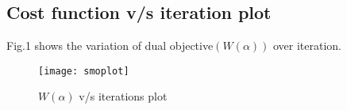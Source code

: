 \documentclass{article}
\begin{document}
\subsection{\textbf{Cost function v/s iteration plot}}
Fig.1 shows the variation of dual objective$(W(\alpha))$ over iteration.
\begin{figure}[H]
  \centering
  \texttt{[image: smoplot]}
  \caption{$W(\alpha)$ v/s iterations plot}
\end{figure}




\end{document}
